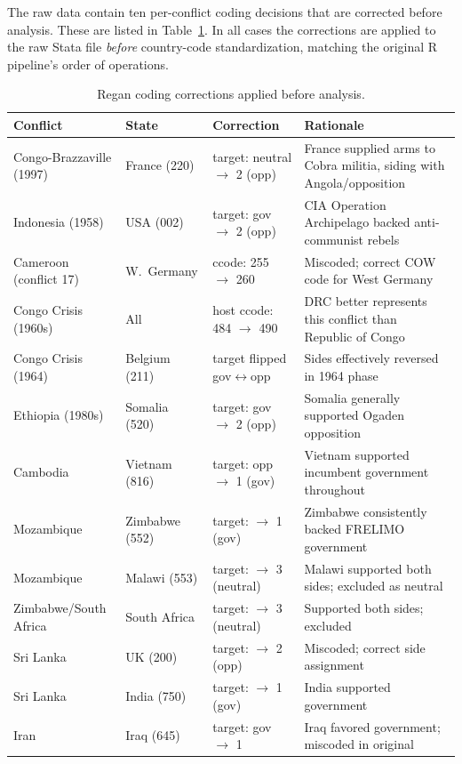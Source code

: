The raw \citet{regan2000} data contain ten per-conflict coding decisions that are
corrected before analysis.  These are listed in
Table~\ref{tab:regan-corrections}.  In all cases the corrections are applied to the raw
Stata file \textit{before} country-code standardization, matching the original R
pipeline's order of operations.

\begin{table}[t]
  \centering
  \footnotesize
  \begin{tabular}{@{}p{3cm}lp{3cm}p{4.5cm}@{}}
    \toprule
    \textbf{Conflict} & \textbf{State} & \textbf{Correction} & \textbf{Rationale} \\
    \midrule
    Congo-Brazzaville (1997) & France (220) & target: neutral $\to$ 2 (opp) & France supplied arms to Cobra militia, siding with Angola/opposition \\
    Indonesia (1958) & USA (002) & target: gov $\to$ 2 (opp) & CIA Operation Archipelago backed anti-communist rebels \\
    Cameroon (conflict 17) & W.\ Germany & ccode: 255 $\to$ 260 & Miscoded; correct COW code for West Germany \\
    Congo Crisis (1960s) & All & host ccode: 484 $\to$ 490 & DRC better represents this conflict than Republic of Congo \\
    Congo Crisis (1964) & Belgium (211) & target flipped gov$\leftrightarrow$opp & Sides effectively reversed in 1964 phase \\
    Ethiopia (1980s) & Somalia (520) & target: gov $\to$ 2 (opp) & Somalia generally supported Ogaden opposition \\
    Cambodia & Vietnam (816) & target: opp $\to$ 1 (gov) & Vietnam supported incumbent government throughout \\
    Mozambique & Zimbabwe (552) & target: $\to$ 1 (gov) & Zimbabwe consistently backed FRELIMO government \\
    Mozambique & Malawi (553) & target: $\to$ 3 (neutral) & Malawi supported both sides; excluded as neutral \\
    Zimbabwe/South Africa & South Africa & target: $\to$ 3 (neutral) & Supported both sides; excluded \\
    Sri Lanka & UK (200) & target: $\to$ 2 (opp) & Miscoded; correct side assignment \\
    Sri Lanka & India (750) & target: $\to$ 1 (gov) & India supported government \\
    Iran & Iraq (645) & target: gov $\to$ 1 & Iraq favored government; miscoded in original \\
    \bottomrule
  \end{tabular}
  \caption{Regan coding corrections applied before analysis.}
  \label{tab:regan-corrections}
\end{table}

